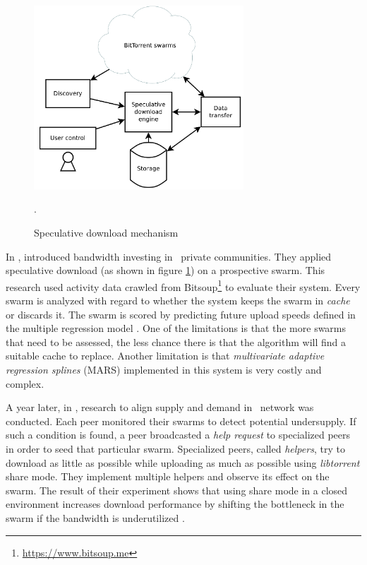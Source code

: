 \begin{figure}[h]
	\centering
	\includegraphics[width=0.7\textwidth]{pics/SDE2013.png}
	\caption{Speculative download mechanism \cite{2013:investmentcm:capota}}.
	\label{fig:sde13}
\end{figure}

In \citeyear{2013:investmentcm:capota}, \citeauthor{2013:investmentcm:capota} introduced bandwidth investing in \bt~private communities. They applied speculative download (as shown in figure \ref{fig:sde13}) on a prospective swarm. This research used activity data crawled from Bitsoup\footnote{\url{https://www.bitsoup.me}} to evaluate their system. Every swarm is analyzed with regard to whether the system keeps the swarm in \textit{cache} or discards it. The swarm is scored by predicting future upload speeds defined in the multiple regression model \cite{2013:investmentcm:capota}. One of the limitations is that the more swarms that need to be assessed, the less chance there is that the algorithm will find a suitable cache to replace. Another limitation is that \textit{multivariate adaptive regression splines} (MARS) implemented in this system is very costly and complex.

A year later, in \citeyear{2014:bwmarket:capota},  research to align supply and demand in \bt~network was conducted. Each peer monitored their swarms to detect potential undersupply. If such a condition is found, a peer broadcasted a \textit{help request} to specialized peers in order to seed that particular swarm. Specialized peers, called \textit{helpers}, try to download as little as possible while uploading as much as possible using \textit{libtorrent} share mode. They implement multiple helpers and observe its effect on the swarm. The result of their experiment shows that using share mode in a closed environment increases download performance  by shifting the bottleneck in the swarm if the bandwidth is underutilized \cite{2014:bwmarket:capota}. 

